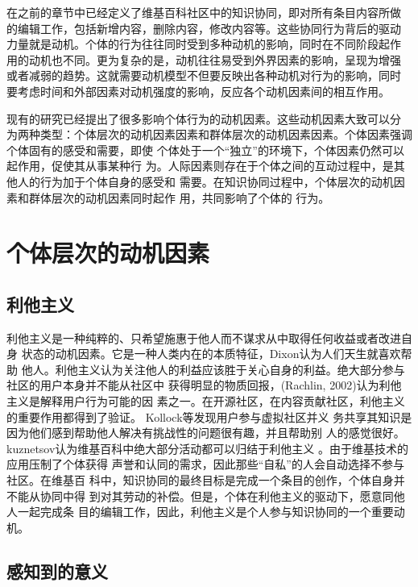 在之前的章节中已经定义了维基百科社区中的知识协同，即对所有条目内容所做
的编辑工作，包括新增内容，删除内容，修改内容等。这些协同行为背后的驱动
力量就是动机。个体的行为往往同时受到多种动机的影响，同时在不同阶段起作
用的动机也不同。更为复杂的是，动机往往易受到外界因素的影响，呈现为增强
或者减弱的趋势。这就需要动机模型不但要反映出各种动机对行为的影响，同时
要考虑时间和外部因素对动机强度的影响，反应各个动机因素间的相互作用。

现有的研究已经提出了很多影响个体行为的动机因素。这些动机因素大致可以分
为两种类型：个体层次的动机因素因素和群体层次的动机因素因素。个体因素强调个体固有的感受和需要，即使
个体处于一个“独立”的环境下，个体因素仍然可以起作用，促使其从事某种行
为。人际因素则存在于个体之间的互动过程中，是其他人的行为加于个体自身的感受和
需要。在知识协同过程中，个体层次的动机因素和群体层次的动机因素同时起作
用，共同影响了个体的
行为。

\section{个体层次的动机因素}
\label{sec:individual-factor}

\subsection{利他主义}
\label{sec:altruism}

利他主义是一种纯粹的、只希望施惠于他人而不谋求从中取得任何收益或者改进自身
状态的动机因素。它是一种人类内在的本质特征，Dixon认为人们天生就喜欢帮助
他人。利他主义认为关注他人的利益应该胜于关心自身的利益。绝大部分参与社区的用户本身并不能从社区中
获得明显的物质回报，(Rachlin, 2002)认为利他主义是解释用户行为可能的因
素之一。在开源社区，在内容贡献社区，利他主义的重要作用都得到了验证\cite{oreg2008exploring}。
Kollock等发现用户参与虚拟社区并义
务共享其知识是因为他们感到帮助他人解决有挑战性的问题很有趣，并且帮助别
人的感觉很好\cite{Smith1999}。kuznetsov认为维基百科中绝大部分活动都可以归结于利他主义
\cite{kuznetsov2006motivations}。由于维基技术的应用压制了个体获得
声誉和认同的需求，因此那些“自私”的人会自动选择不参与社区\cite{4076406}。在维基百
科中，知识协同的最终目标是完成一个条目的创作，个体自身并不能从协同中得
到对其劳动的补偿。但是，个体在利他主义的驱动下，愿意同他人一起完成条
目的编辑工作，因此，利他主义是个人参与知识协同的一个重要动机。

\subsection{感知到的意义}
\label{sec:sense-of-meaning}

